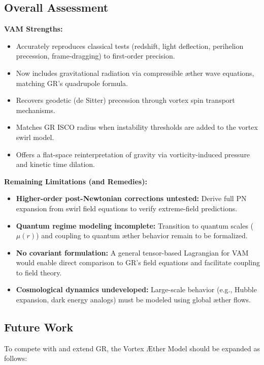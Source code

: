 \vspace{1em}

\subsection*{Overall Assessment}

\textbf{VAM Strengths:}
\begin{itemize}
    \item Accurately reproduces classical tests (redshift, light deflection, perihelion precession, frame-dragging) to first-order precision.
    \item Now includes gravitational radiation via compressible æther wave equations, matching GR’s quadrupole formula.
    \item Recovers geodetic (de Sitter) precession through vortex spin transport mechanisms.
    \item Matches GR ISCO radius when instability thresholds are added to the vortex swirl model.
    \item Offers a flat-space reinterpretation of gravity via vorticity-induced pressure and kinetic time dilation.
\end{itemize}

\textbf{Remaining Limitations (and Remedies):}
\begin{itemize}
    \item \textbf{Higher-order post-Newtonian corrections untested:} Derive full PN expansion from swirl field equations to verify extreme-field predictions.
    \item \textbf{Quantum regime modeling incomplete:} Transition to quantum scales (\( \mu(r) \)) and coupling to quantum æther behavior remain to be formalized.
    \item \textbf{No covariant formulation:} A general tensor-based Lagrangian for VAM would enable direct comparison to GR’s field equations and facilitate coupling to field theory.
    \item \textbf{Cosmological dynamics undeveloped:} Large-scale behavior (e.g., Hubble expansion, dark energy analogs) must be modeled using global æther flows.
\end{itemize}

\subsection*{Future Work}

To compete with and extend GR, the Vortex Æther Model should be expanded as follows:

